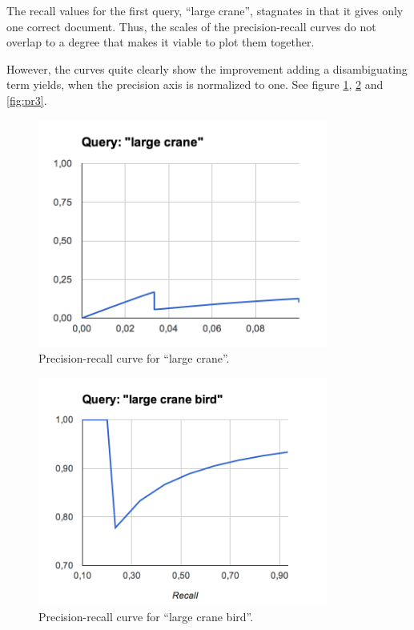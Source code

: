 \documentclass[11pt,a4paper]{article}
\begin{document}
      The recall values for the first query, ``large crane'', stagnates in that it gives only one correct document.
      Thus, the scales of the precision-recall curves do not overlap to a degree that makes it viable to plot them together.

      However, the curves quite clearly show the improvement adding a disambiguating term yields, when the precision axis is normalized to one. See figure \ref{fig:pr1}, \ref{fig:pr2} and \ref{fig:pr3}.

      \begin{figure}[h]
        \includegraphics[width=0.85\textwidth]{imgs/large_crane_pr}
        \caption{Precision-recall curve for ``large crane''.}
        \label{fig:pr1}
      \end{figure}

      \begin{figure}[h]
        \includegraphics[width=0.85\textwidth]{imgs/large_crane_bird_pr}
        \caption{Precision-recall curve for ``large crane bird''.}
        \label{fig:pr2}
      \end{figure}
\end{document}
